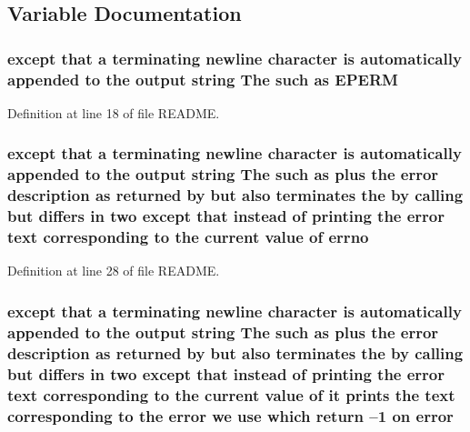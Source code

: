 \subsection{Variable Documentation}
\hypertarget{common_2README_a9f655c76c94b7fe5fa4714a077ef4d7e}{
\subsubsection[{E\-P\-E\-R\-M}]{\setlength{\rightskip}{0pt plus 5cm}except that a terminating newline character is automatically appended to {\bf the} output string The such as E\-P\-E\-R\-M}}\label{common_2README_a9f655c76c94b7fe5fa4714a077ef4d7e}


Definition at line 18 of file R\-E\-A\-D\-M\-E.

\hypertarget{common_2README_afe75ee0c7e5a90ba6bb38426ea69b996}{
\subsubsection[{errno}]{\setlength{\rightskip}{0pt plus 5cm}except that a terminating newline character is automatically appended to {\bf the} output string The such as plus {\bf the} {\bf error} description as returned by but also terminates {\bf the} by calling but differs in two except that instead of printing {\bf the} {\bf error} text corresponding to {\bf the} current value of errno}}\label{common_2README_afe75ee0c7e5a90ba6bb38426ea69b996}


Definition at line 28 of file R\-E\-A\-D\-M\-E.

\hypertarget{common_2README_a80171b13188418b4328f9247d3aff3d2}{
\subsubsection[{error}]{\setlength{\rightskip}{0pt plus 5cm}except that a terminating newline character is automatically appended to {\bf the} output string The such as plus {\bf the} error description as returned by but also terminates {\bf the} by calling but differs in two except that instead of printing {\bf the} error text corresponding to {\bf the} current value of it prints {\bf the} text corresponding to {\bf the} error we use which return –1 on error}}\label{common_2README_a80171b13188418b4328f9247d3aff3d2}


